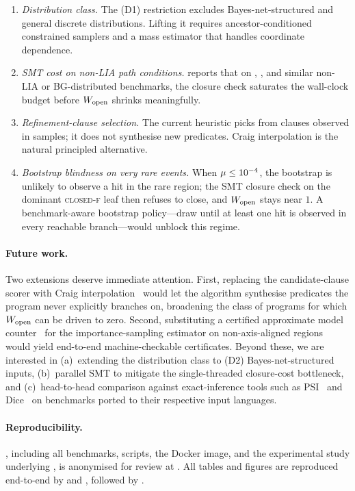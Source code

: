 \begin{enumerate}
\item \emph{Distribution class.}  The (D1) restriction excludes
  Bayes-net-structured and general discrete distributions.  Lifting it
  requires ancestor-conditioned constrained samplers and a mass
  estimator that handles coordinate dependence.
\item \emph{SMT cost on non-LIA path conditions.}
   reports that on ,
  , and similar non-LIA or BG-distributed
  benchmarks, the closure check saturates the wall-clock budget
  before $W_{\mathrm{open}}$ shrinks meaningfully.
\item \emph{Refinement-clause selection.}  The current heuristic
  picks from clauses observed in samples; it does not synthesise new
  predicates.  Craig interpolation is the natural principled
  alternative.
\item \emph{Bootstrap blindness on very rare events.}
  When $\mu \le 10^{-4}$, the bootstrap is unlikely to observe a
  hit in the rare region; the SMT closure check on the dominant
  \textsc{closed-f} leaf then refuses to close, and $W_{\mathrm{open}}$ stays
  near $1$.  A benchmark-aware bootstrap policy---draw until at least
  one hit is observed in every reachable branch---would unblock this
  regime.
\end{enumerate}

\paragraph{Future work.}
Two extensions deserve immediate attention.  First, replacing the
candidate-clause scorer with Craig
interpolation~\cite{mcmillan2003interpolation,henzinger2004abstraction}
would let the algorithm synthesise predicates the program never
explicitly branches on, broadening the class of programs for which
$W_{\mathrm{open}}$ can be driven to zero.  Second, substituting a certified
approximate model counter~\cite{kiesl2024certified,yang2023approxmc6}
for the importance-sampling estimator on non-axis-aligned regions
would yield end-to-end machine-checkable certificates.  Beyond these,
we are interested in (a)~extending the distribution class to (D2)
Bayes-net-structured inputs, (b)~parallel SMT to mitigate the
single-threaded closure-cost bottleneck, and (c)~head-to-head
comparison against exact-inference tools such as PSI~\cite{psi} and
Dice~\cite{holtzen2020dice} on benchmarks ported to their respective
input languages.

\paragraph{Reproducibility.}
\toolname{}, including all benchmarks, scripts, the Docker image, and
the experimental study underlying , is anonymised
for review at .  All tables and
figures are reproduced end-to-end by
 and
, followed by
.

